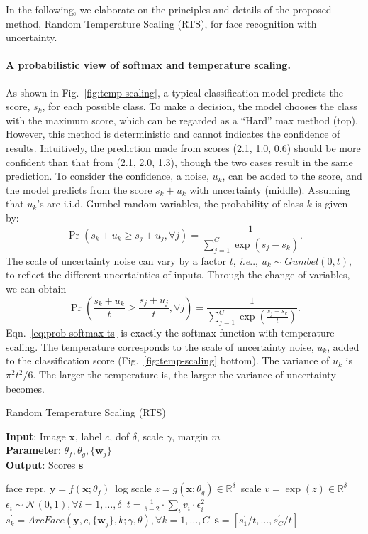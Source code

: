 \documentclass[letterpaper]{article} %
\makeatletter
\DeclareRobustCommand\onedot{\futurelet\@let@token\@onedot}
\def\@onedot{\ifx\@let@token.\else.\null\fi\xspace}
\def\ie{\emph{i.e}\onedot} \def\Ie{\emph{I.e}\onedot}
\makeatother
\begin{document}
In the following, we elaborate on the principles and details of the proposed method, Random Temperature Scaling (RTS), for face recognition with uncertainty.


\paragraph{A probabilistic view of softmax and temperature scaling.}
As shown in Fig.~\ref{fig:temp-scaling}, a typical classification model predicts the score, $s_k$, for each possible class. To make a decision, the model chooses the class with the maximum score, which can be regarded as a ``Hard'' max method (top).
However, this method is deterministic and cannot indicates the confidence of results. Intuitively, the prediction made from scores (2.1, 1.0, 0.6) should be more confident than that from (2.1, 2.0, 1.3), though the two cases result in the same prediction.
To consider the confidence, a noise, $u_k$, can be added to the score, and the model predicts from the score $s_k + u_k$ with uncertainty (middle). Assuming that $u_k$'s are i.i.d. Gumbel random variables, the probability of class $k$ is given by:
\begin{equation}
\Pr(s_k+u_k \geq s_j+u_j, \forall j) = \frac{1}{\sum_{j = 1}^{C} \exp(s_j - s_k)}.
\label{eq:prob-softmax}
\end{equation}
The scale of uncertainty noise can vary by a factor $t$, \ie, $u_k\sim Gumbel(0, t)$, to reflect the different uncertainties of inputs. Through the change of variables, we can obtain
\begin{equation}
\Pr(\frac{s_k+u_k}{t} \geq \frac{s_j+u_j}{t}, \forall j) = \frac{1}{\sum_{j = 1}^{C} \exp(\frac{s_j - s_k}{t})}.
\label{eq:prob-softmax-ts}
\end{equation}
Eqn.~\ref{eq:prob-softmax-ts} is exactly the softmax function with temperature scaling. The temperature corresponds to the scale of uncertainty noise, $u_k$, added to the classification score (Fig.~\ref{fig:temp-scaling} bottom). The variance of $u_k$ is $\pi^2 t^2 / 6$. The larger the temperature is, the larger the variance of uncertainty becomes.

\begin{algorithm}[tb]
\caption{Random Temperature Scaling (RTS)}
\label{alg:rts}
\textbf{Input}: Image $\bm{x}$, label $c$, dof $\delta$, scale $\gamma$, margin $m$ \\
\textbf{Parameter}: $\theta_f, \theta_g, \{\bm{w}_j\}$ \\
\textbf{Output}: Scores $\bm{s}$
\begin{algorithmic}[1] %
\STATE face repr. $\bm{y} = f(\bm{x}; \theta_f)$\
\STATE log scale $z = g(\bm{x}; \theta_g) \in \mathbb{R^\delta}$\
\STATE scale $v = \exp (z) \in \mathbb{R^\delta}$\
\STATE $\epsilon_i \sim \mathcal{N}(0, 1), \forall i = 1, \dots, \delta$\
\STATE $t = \frac{1}{\delta - 2} \cdot \sum_i v_i\cdot \epsilon_i^2$\
\STATE $s_k^\prime = ArcFace(\bm{y}, c, \{\bm{w}_j\}, k; \gamma, \theta), \forall k = 1, \dots, C$\
\STATE $\bm{s} = [s_1^\prime / t, \dots, s_C^\prime / t]$\
\end{algorithmic}
\end{algorithm}
\end{document}
